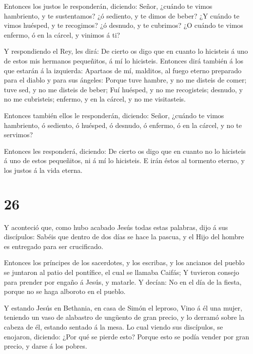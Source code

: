  Entonces los justos le responderán, diciendo: Señor,
¿cuándo te vimos hambriento, y te sustentamos? ¿ó sediento, y te dimos
de beber?  ¿Y cuándo te vimos huésped, y te recogimos? ¿ó
desnudo, y te cubrimos?  ¿O cuándo te vimos enfermo, ó en
la cárcel, y vinimos á ti?

 Y respondiendo el Rey, les dirá: De cierto os digo que en
cuanto lo hicisteis á uno de estos mis hermanos pequeñitos, á mí lo
hicisteis.  Entonces dirá también á los que estarán á la
izquierda: Apartaos de mí, malditos, al fuego eterno preparado para el
diablo y para sus ángeles:  Porque tuve hambre, y no me
disteis de comer; tuve sed, y no me disteis de beber;  Fuí
huésped, y no me recogisteis; desnudo, y no me cubristeis; enfermo, y en
la cárcel, y no me visitasteis.

 Entonces también ellos le responderán, diciendo: Señor,
¿cuándo te vimos hambriento, ó sediento, ó huésped, ó desnudo, ó
enfermo, ó en la cárcel, y no te servimos?

 Entonces les responderá, diciendo: De cierto os digo que
en cuanto no lo hicisteis á uno de estos pequeñitos, ni á mí lo
hicisteis.  E irán éstos al tormento eterno, y los justos á
la vida eterna.

\hypertarget{section-25}{%
\section{26}\label{section-25}}

 Y aconteció que, como hubo acabado Jesús todas estas
palabras, dijo á sus discípulos:  Sabéis que dentro de dos
días se hace la pascua, y el Hijo del hombre es entregado para ser
crucificado.

 Entonces los príncipes de los sacerdotes, y los escribas, y
los ancianos del pueblo se juntaron al patio del pontífice, el cual se
llamaba Caifás;  Y tuvieron consejo para prender por engaño
á Jesús, y matarle.  Y decían: No en el día de la fiesta,
porque no se haga alboroto en el pueblo.

 Y estando Jesús en Bethania, en casa de Simón el leproso,
 Vino á él una mujer, teniendo un vaso de alabastro de
ungüento de gran precio, y lo derramó sobre la cabeza de él, estando
sentado á la mesa.  Lo cual viendo sus discípulos, se
enojaron, diciendo: ¿Por qué se pierde esto?  Porque esto se
podía vender por gran precio, y darse á los pobres.

